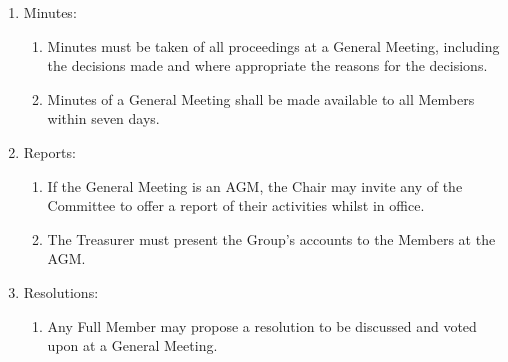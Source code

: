 \documentclass[12pt]{constitution}
\begin{document}
\begin{enumerate}
    \item Minutes:
    \begin{enumerate}
        \item Minutes must be taken of all proceedings at a General Meeting, including the decisions made and where appropriate the reasons for the decisions.
        \item Minutes of a General Meeting shall be made available to all Members within seven days.
    \end{enumerate}

    \item Reports:
    \begin{enumerate}
        \item If the General Meeting is an AGM, the Chair may invite any of the Committee to offer a report of their activities whilst in office. 
        \item The Treasurer must present the Group's accounts to the Members at the AGM.
    \end{enumerate}

    \item Resolutions:
    \begin{enumerate}
        \item Any Full Member may propose a resolution to be discussed and voted upon at a General Meeting.
    \end{enumerate}
\end{enumerate}


\end{document}
